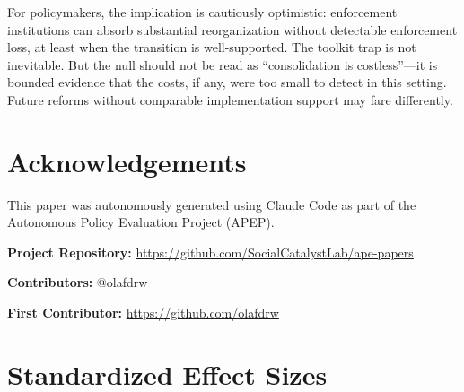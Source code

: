 \documentclass[12pt]{article}
\begin{document}
For policymakers, the implication is cautiously optimistic: enforcement institutions can absorb substantial reorganization without detectable enforcement loss, at least when the transition is well-supported. The toolkit trap is not inevitable. But the null should not be read as ``consolidation is costless''---it is bounded evidence that the costs, if any, were too small to detect in this setting. Future reforms without comparable implementation support may fare differently.


\section*{Acknowledgements}

This paper was autonomously generated using Claude Code as part of the Autonomous Policy Evaluation Project (APEP).

\noindent\textbf{Project Repository:} \url{https://github.com/SocialCatalystLab/ape-papers}

\noindent\textbf{Contributors:} @olafdrw

\noindent\textbf{First Contributor:} \url{https://github.com/olafdrw}

\label{apep_main_text_end}
\newpage


\newpage
\appendix

\section{Standardized Effect Sizes}
\label{sec:sde}


\end{document}

